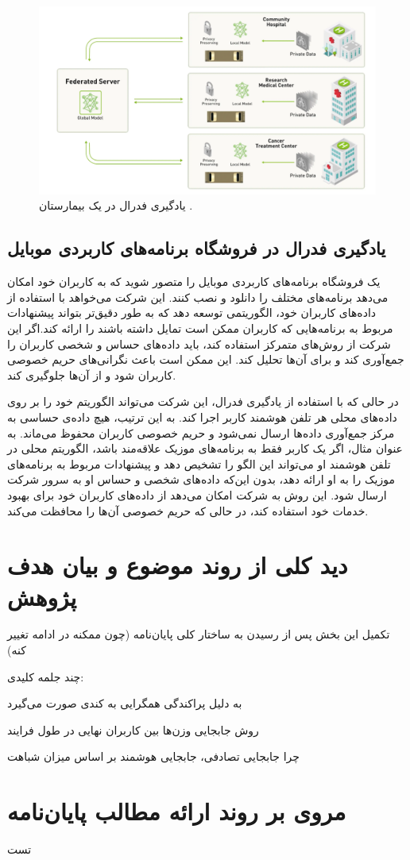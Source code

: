 \begin{figure}[t]
	\centering
	\includegraphics[scale=1]{images/chap1/hospital.png}%
	\caption{%
		یادگیری فدرال در یک بیمارستان
		\cite{kim2012control}%
		.
	}
	\label{hospital}
	\centering
\end{figure}


\subsection{یادگیری فدرال در فروشگاه برنامه‌های کاربردی موبایل}
یک فروشگاه برنامه‌های کاربردی%
موبایل را متصور شوید که به کاربران خود امکان می‌دهد برنامه‌های مختلف را دانلود و نصب کنند. این شرکت می‌خواهد با استفاده از داده‌های کاربران خود، الگوریتمی توسعه دهد که به طور دقیق‌تر بتواند پیشنهادات مربوط به برنامه‌هایی که کاربران ممکن است تمایل داشته باشند را ارائه کند.اگر این شرکت از روش‌های متمرکز استفاده کند، باید داده‌های حساس و شخصی کاربران را جمع‌آوری کند و برای آن‌ها تحلیل کند. این ممکن است باعث نگرانی‌های حریم خصوصی کاربران شود و از آن‌ها جلوگیری کند.

در حالی که با استفاده از یادگیری فدرال، این شرکت می‌تواند الگوریتم خود را بر روی داده‌های محلی هر تلفن هوشمند کاربر اجرا کند. به این ترتیب، هیچ داده‌ی حساسی به مرکز جمع‌آوری داده‌ها ارسال نمی‌شود و حریم خصوصی کاربران محفوظ می‌ماند. به عنوان مثال، اگر یک کاربر فقط به برنامه‌های موزیک علاقه‌مند باشد، الگوریتم محلی در تلفن هوشمند او می‌تواند این الگو را تشخیص دهد و پیشنهادات مربوط به برنامه‌های موزیک را به او ارائه دهد، بدون این‌که داده‌های شخصی و حساس او به سرور شرکت ارسال شود. این روش به شرکت امکان می‌دهد از داده‌های کاربران خود برای بهبود خدمات خود استفاده کند، در حالی که حریم خصوصی آن‌ها را محافظت می‌کند.


\section{دید کلی از روند موضوع و بیان هدف پژوهش}
تکمیل این بخش پس از رسیدن به ساختار کلی پایان‌نامه (چون ممکنه در ادامه تغییر کنه)

چند جلمه کلیدی:

به دلیل پراکندگی همگرایی به کندی صورت می‌گیرد

روش جابجایی وزن‌ها بین کاربران نهایی در طول فرایند

چرا جابجایی تصادفی، جابجایی هوشمند بر اساس میزان شباهت

\section{مروی بر روند ارائه مطالب پایان‌نامه}
تست

